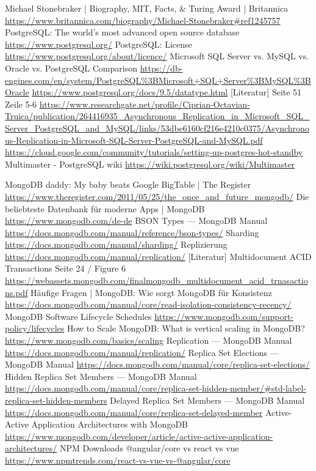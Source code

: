 \begin{thebibliography}{HR08}
   Michael Stonebraker | Biography, MIT, Facts, \& Turing Award | Britannica \url{https://www.britannica.com/biography/Michael-Stonebraker#ref1245757}
   PostgreSQL: The world's most advanced open source database \url{https://www.postgresql.org/}
   PostgreSQL: License \url{https://www.postgresql.org/about/licence/}
   Microsoft SQL Server vs. MySQL vs. Oracle vs. PostgreSQL Comparison \url{https://db-engines.com/en/system/PostgreSQL%3BMicrosoft+SQL+Server%3BMySQL%3BOracle}
   \url{https://www.postgresql.org/docs/9.5/datatype.html}
   [Literatur] Seite 51 Zeile 5-6 \url{https://www.researchgate.net/profile/Ciprian-Octavian-Truica/publication/264416935_Asynchronous_Replication_in_Microsoft_SQL_Server_PostgreSQL_and_MySQL/links/53dbe6160cf216e4210c0375/Asynchronous-Replication-in-Microsoft-SQL-Server-PostgreSQL-and-MySQL.pdf}
   \url{https://cloud.google.com/community/tutorials/setting-up-postgres-hot-standby}
   Multimaster - PostgreSQL wiki \url{https://wiki.postgresql.org/wiki/Multimaster}

   MongoDB daddy: My baby beats Google BigTable | The Register \url{https://www.theregister.com/2011/05/25/the_once_and_future_mongodb/}
   Die beliebteste Datenbank für moderne Apps | MongoDB \url{https://www.mongodb.com/de-de}
   BSON Types — MongoDB Manual \url{https://docs.mongodb.com/manual/reference/bson-types/}
   Sharding \url{https://docs.mongodb.com/manual/sharding/}
   Replizierung \url{https://docs.mongodb.com/manual/replication/}
   [Literatur] Multidocument ACID Transactions Seite 24 / Figure 6 \url{https://webassets.mongodb.com/finalmongodb_multidocument_acid_trnasactions.pdf}
   Häufige Fragen | MongoDB: Wie sorgt MongoDB für Konsistenz \url{https://docs.mongodb.com/manual/core/read-isolation-consistency-recency/}
   MongoDB Software Lifecycle Schedules \url{https://www.mongodb.com/support-policy/lifecycles}
   How to Scale MongoDB: What is vertical scaling in MongoDB? \url{https://www.mongodb.com/basics/scaling}
   Replication — MongoDB Manual \url{https://docs.mongodb.com/manual/replication/}
   Replica Set Elections — MongoDB Manual \url{https://docs.mongodb.com/manual/core/replica-set-elections/}
   Hidden Replica Set Members — MongoDB Manual \url{https://docs.mongodb.com/manual/core/replica-set-hidden-member/#std-label-replica-set-hidden-members}
   Delayed Replica Set Members — MongoDB Manual \url{https://docs.mongodb.com/manual/core/replica-set-delayed-member}
   Active-Active Application Architectures with MongoDB \url{https://www.mongodb.com/developer/article/active-active-application-architectures/}
   NPM Downloads @angular/core vs react vs vue  \url{https://www.npmtrends.com/react-vs-vue-vs-@angular/core}


\end{thebibliography}
